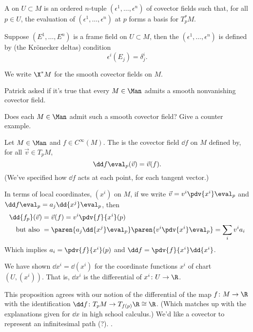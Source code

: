 \begin{defn}
    A  on $U \subset M$ is an ordered $n$-tuple $(\epsilon^1, \ldots, \epsilon^n)$ of covector fields such that, for all $p \in U$, the evaluation of $(\epsilon^1, \ldots, \epsilon^n)$  at $p$ forms a basis for $T^*_p M$.

    Suppose $(E^1, \ldots, E^n)$ is a frame field on $U \subset M$, then the  $(\epsilon^1, \ldots, \epsilon^n)$ is defined by (the Krönecker deltas) condition
    \[
        \epsilon^i(E_j) = \delta^i_j.
    \]
    
    We write $\X^* M$ for the smooth covector fields on $M$.
\end{defn}

Patrick asked if it's true that every $M \in \Man$ admits a smooth nonvanishing covector field. 

\begin{todo}[]
   Does each $M \in \Man$ admit such a smooth covector field? Give a counter example.
\end{todo}

\begin{defn}
   Let $M \in \Man$ and $f \in C^\infty(M)$. The  is the covector field $\dd f$ on $M$ defined by, for all $\vec v \in T_p M$,
   \[
      \dd f \eval_p (\vec v) = \vec v (f).
   \]
   (We've specified how $ \dd f$ acts at each point, for each tangent vector.)
\end{defn}

In terms of local coordinates, $(x^i)$ on $M$, if we write $\vec v = v^i \pdv{x^i} \eval_p$ and $\dd f \eval_p = a_j \dd { x^j } \eval_p$, then 
\begin{align}
   \dd { f_p } (\vec v) & = \vec v (f) = v^i \pdv{f}{x^i}(p)\\
   \text{ but also } & = \paren{a_j \dd { x^j } \eval_p} \paren{v^i \pdv{x^i} \eval_p} = \sum_i v^i a_i
\end{align}
Which implies $a_i = \pdv{f}{x^i}(p)$ and $\dd f = \pdv{f}{x^i} \dd { x^i }$.

\begin{prop}
   We have shown $\dd { x^i } = \dd {(x^i)}$ for the coordinate functions $x^i$ of chart $(U, (x^i))$. That is, $\dd { x^i }$ is the differential of $x^i \colon U \to \R$.
\end{prop}

\begin{note}[]
   This proposition agrees with our notion of the differential of the map $f \colon M \to \R$ with the identification $\dd f \colon T_p M \to T_{f(p)} \R \cong \R$. (Which matches up with the explanations given for $\dd x$ in high school calculus.) We'd like a covector to represent an infinitesimal path (?). \TODO.
\end{note}

